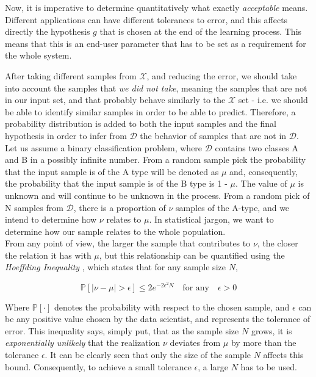 Now, it is imperative to determine quantitatively what exactly \emph{acceptable} means. Different applications can have different tolerances to error, and this affects directly the hypothesis \( g \) that is chosen at the end of the learning process. This means that this is an end-user parameter that has to be set as a requirement for the whole system.

After taking different samples from \( \mathcal{X} \), and reducing the error, we should take into account the samples that \emph{we did not take}, meaning the samples that are not in our input set, and that probably behave similarly to the \( \mathcal{X} \) set - i.e. we should be able to identify similar samples in order to be able to predict. Therefore, a probability distribution is added to both the input samples and the final hypothesis in order to infer from \( \mathcal{D} \) the behavior of samples that are not in \( \mathcal{D} \). Let us assume a binary classification problem, where \( \mathcal{D} \) contains two classes A and B in a possibly infinite number. From a random sample pick the probability that the input sample is of the A type will be denoted as \(\mu\) and, consequently, the probability that the input sample is of the B type is 1 - \(\mu\). The value of \(\mu\) is unknown and will continue to be unknown in the process. From a random pick of N samples from \( \mathcal{D} \), there is a proportion of \(\nu\) samples of the A-type, and we intend to determine how \(\nu\) relates to \(\mu\). In statistical jargon, we want to determine how our sample relates to the whole population. \\

From any point of view, the larger the sample that contributes to \(\nu\), the closer the relation it has with \(\mu\), but this relationship can be quantified using the \emph{Hoeffding Inequality} \cite{Hoeffding1963}, which states that for any sample size \(N\),

\begin{equation}
  \mathbb{P}[|\nu -\mu|>\epsilon ]\leq 2e^{-2\epsilon^{2}N} \quad \text{for any}\quad \epsilon>0
\end{equation}

Where \(\mathbb{P}[\cdot]\) denotes the probability with respect to the chosen sample, and \(\epsilon\) can be any positive value chosen by the data scientist, and represents the tolerance of error. This inequality says, simply put, that as the sample size \(N\) grows, it is \emph{exponentially unlikely} that the realization \(\nu\) deviates from \(\mu\) by more than the tolerance \(\epsilon\). It can be clearly seen that only the size of the sample \(N\) affects this bound. Consequently, to achieve a small tolerance \(\epsilon\), a large \(N\) has to be used.\\

